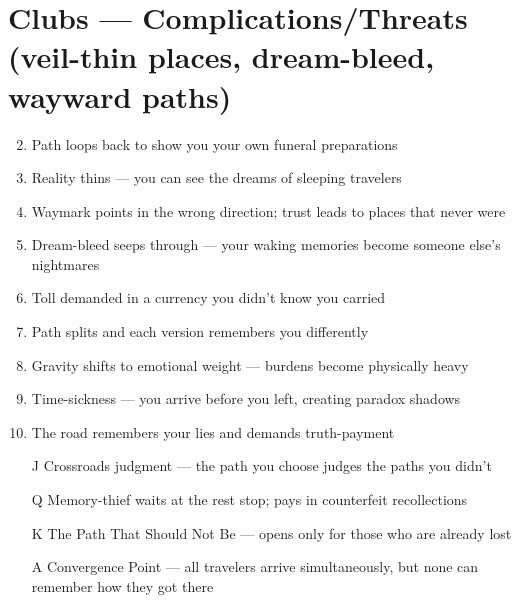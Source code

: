 \section*{Clubs --- Complications/Threats (veil-thin places, dream-bleed, wayward paths)}
\label{sec:ways-between-complications}
\begin{enumerate}
\setcounter{enumi}{1}
\item Path loops back to show you your own funeral preparations
\item Reality thins --- you can see the dreams of sleeping travelers
\item Waymark points in the wrong direction; trust leads to places that never were
\item Dream-bleed seeps through --- your waking memories become someone else's nightmares
\item Toll demanded in a currency you didn't know you carried
\item Path splits and each version remembers you differently
\item Gravity shifts to emotional weight --- burdens become physically heavy
\item Time-sickness --- you arrive before you left, creating paradox shadows
\item The road remembers your lies and demands truth-payment
\item[J] Crossroads judgment --- the path you choose judges the paths you didn't
\item[Q] Memory-thief waits at the rest stop; pays in counterfeit recollections
\item[K] The Path That Should Not Be --- opens only for those who are already lost
\item[A] Convergence Point --- all travelers arrive simultaneously, but none can remember how they got there
\end{enumerate}

